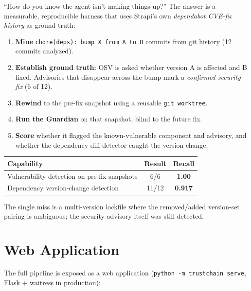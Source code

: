 \documentclass[11pt,a4paper]{article}
\begin{document}
``How do you know the agent isn't making things up?'' The answer is a measurable,
reproducible harness that uses Strapi's own \emph{dependabot CVE-fix history} as
ground truth:

\begin{enumerate}[itemsep=2pt]
  \item \textbf{Mine} \texttt{chore(deps): bump X from A to B} commits from git history
        (12 commits analyzed).
  \item \textbf{Establish ground truth:} OSV is asked whether version A is affected and
        B fixed. Advisories that disappear across the bump mark a \emph{confirmed
        security fix} (6 of 12).
  \item \textbf{Rewind} to the pre-fix snapshot using a reusable \texttt{git worktree}.
  \item \textbf{Run the Guardian} on that snapshot, blind to the future fix.
  \item \textbf{Score} whether it flagged the known-vulnerable component and advisory,
        and whether the dependency-diff detector caught the version change.
\end{enumerate}

\begin{center}
\begin{tabular}{@{}lcc@{}}
\toprule
\textbf{Capability} & \textbf{Result} & \textbf{Recall} \\
\midrule
Vulnerability detection on pre-fix snapshots & 6/6 & \textbf{1.00} \\
Dependency version-change detection          & 11/12 & \textbf{0.917} \\
\bottomrule
\end{tabular}
\end{center}

The single miss is a multi-version lockfile where the removed/added version-set pairing
is ambiguous; the security advisory itself was still detected.

\section{Web Application}

The full pipeline is exposed as a web application (\texttt{python -m trustchain serve},
Flask + waitress in production):
\end{document}
